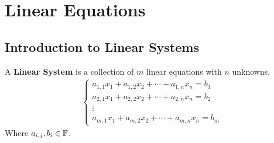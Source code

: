 \section{Linear Equations}

\subsection{Introduction to Linear Systems}
\begin{definition}
    A \textbf{Linear System} is a collection of $m$ linear equations with $n$ unknowns.
    \begin{align*}
        \begin{cases}
            a_{1,1}x_1 + a_{1,2}x_2 + \cdots + a_{1, n} x_n = b_1 \\
            a_{2,1}x_1 + a_{2,2}x_2 + \cdots + a_{2, n} x_n = b_2 \\
            \vdots \\
            a_{m,1}x_1 + a_{m,2}x_2 + \cdots + a_{m, n} x_n = b_m 
        \end{cases}
    \end{align*}
    Where $a_{i,j}, b_i \in \mathbb{F}$.
\end{definition}

